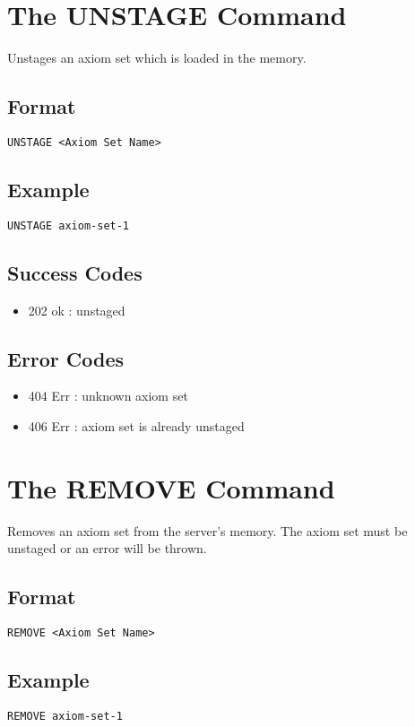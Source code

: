 \section{The UNSTAGE Command}
Unstages an axiom set which is loaded in the memory.
\subsection{Format}
\begin{lstlisting}
UNSTAGE <Axiom Set Name>
\end{lstlisting}
\subsection{Example}
\begin{lstlisting}
UNSTAGE axiom-set-1
\end{lstlisting}
\subsection{Success Codes}
\begin{itemize}
    \item 202 ok : unstaged
\end{itemize}
\subsection{Error Codes}
\begin{itemize}
    \item 404 Err : unknown axiom set
    \item 406 Err : axiom set is already unstaged
\end{itemize}
\clearpage

\section{The REMOVE Command}
Removes an axiom set from the server's memory. The axiom set must be unstaged or an error will be thrown.
\subsection{Format}
\begin{lstlisting}
REMOVE <Axiom Set Name>
\end{lstlisting}
\subsection{Example}
\begin{lstlisting}
REMOVE axiom-set-1
\end{lstlisting}
